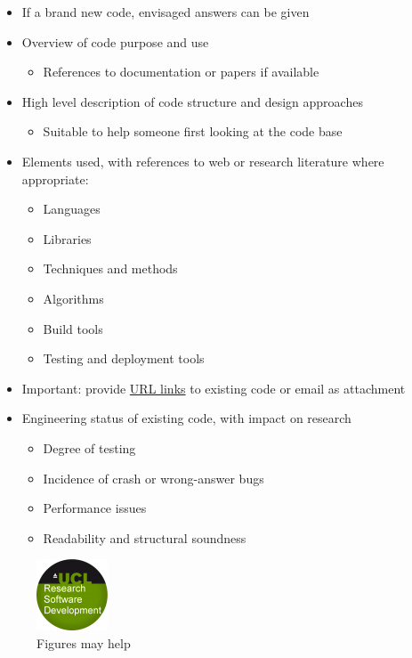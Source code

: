 \documentclass[]{scrartcl}
\begin{document}
\begin{itemize}
\itemsep1pt\parskip0pt
\item
  If a brand new code, envisaged answers can be given
\item
  Overview of code purpose and use

  \begin{itemize}
  \itemsep1pt\parskip0pt
  \item
    References to documentation or papers if available
  \end{itemize}
\item
  High level description of code structure and design approaches

  \begin{itemize}
  \itemsep1pt\parskip0pt
  \item
    Suitable to help someone first looking at the code base
  \end{itemize}
\item
  Elements used, with references to web or research literature where
  appropriate:

  \begin{itemize}
  \itemsep1pt\parskip0pt
  \item
    Languages
  \item
    Libraries
  \item
    Techniques and methods
  \item
    Algorithms
  \item
    Build tools
  \item
    Testing and deployment tools
  \end{itemize}
\item
  Important: provide \href{http://github.com/}{URL links} to existing
  code or email as attachment
\item
  Engineering status of existing code, with impact on research

  \begin{itemize}
  \itemsep1pt\parskip0pt
  \item
    Degree of testing
  \item
    Incidence of crash or wrong-answer bugs
  \item
    Performance issues
  \item
    Readability and structural soundness
  \end{itemize}
\end{itemize}

\begin{figure}[htbp]
\centering
\includegraphics{figure.png}
\caption{\label{Figure} Figures may help}
\end{figure}
\end{document}
